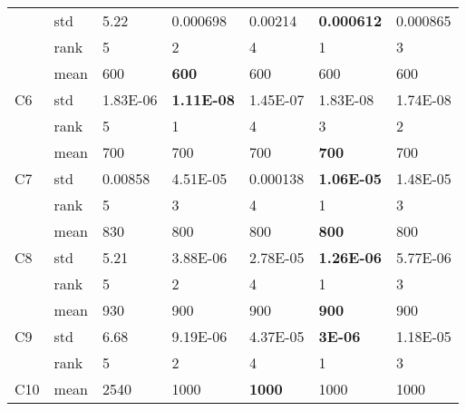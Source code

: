 \begin{table}[]
\begin{tabular}{|l|l|l|l|l|l|l|}
                     & std  & 5.22             & 0.000698          & 0.00214           & \textbf{0.000612} & 0.000865          \\ \cline{2-7} 
                     & rank & 5                & 2                 & 4                 & 1                 & 3                 \\ \hline
\multirow{3}{*}{C6}  & mean & 600              & \textbf{600}      & 600               & 600               & 600               \\ \cline{2-7} 
                     & std  & 1.83E-06         & \textbf{1.11E-08} & 1.45E-07          & 1.83E-08          & 1.74E-08          \\ \cline{2-7} 
                     & rank & 5                & 1                 & 4                 & 3                 & 2                 \\ \hline
\multirow{3}{*}{C7}  & mean & 700              & 700               & 700               & \textbf{700}      & 700               \\ \cline{2-7} 
                     & std  & 0.00858          & 4.51E-05          & 0.000138          & \textbf{1.06E-05} & 1.48E-05          \\ \cline{2-7} 
                     & rank & 5                & 3                 & 4                 & 1                 & 3                 \\ \hline
\multirow{3}{*}{C8}  & mean & 830              & 800               & 800               & \textbf{800}      & 800               \\ \cline{2-7} 
                     & std  & 5.21             & 3.88E-06          & 2.78E-05          & \textbf{1.26E-06} & 5.77E-06          \\ \cline{2-7} 
                     & rank & 5                & 2                 & 4                 & 1                 & 3                 \\ \hline
\multirow{3}{*}{C9}  & mean & 930              & 900               & 900               & \textbf{900}      & 900               \\ \cline{2-7} 
                     & std  & 6.68             & 9.19E-06          & 4.37E-05          & \textbf{3E-06}    & 1.18E-05          \\ \cline{2-7} 
                     & rank & 5                & 2                 & 4                 & 1                 & 3                 \\ \hline
\multirow{3}{*}{C10} & mean & 2540             & 1000              & \textbf{1000}     & 1000              & 1000              \\ \cline{2-7} 

\end{tabular}
\end{table}

